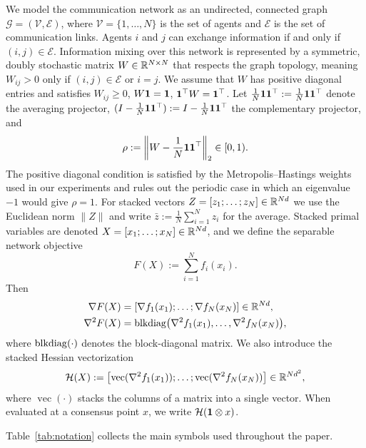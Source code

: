 \documentclass[review,onefignum,onetabnum]{siamart171218}
\begin{document}
	We model the communication network as an undirected, connected
	graph $\mathcal{G} = (\mathcal{V}, \mathcal{E})$, where
	$\mathcal{V} = \{1, \dots, N\}$ is the set of agents and
	$\mathcal{E}$ is the set of communication links.
	Agents $i$ and $j$ can exchange information if and only if
	$(i,j) \in \mathcal{E}$.
	Information mixing over this network is represented by a symmetric,
	doubly stochastic matrix $W \in \mathbb{R}^{N \times N}$ that respects
	the graph topology, meaning $W_{ij} > 0$ only if
	$(i,j) \in \mathcal{E}$ or $i=j$.
	We assume that $W$ has positive diagonal entries and satisfies
	$W_{ij}\ge0$, $W\mathbf{1}=\mathbf{1}$, $\mathbf{1}^\top W=\mathbf{1}^\top$.
	Let $\frac{1}{N}\mathbf{1}\mathbf{1}^\top:=\frac{1}{N}\mathbf{1}\mathbf{1}^\top$ denote the averaging projector,
	$(I-\frac{1}{N}\mathbf{1}\mathbf{1}^\top):=I-\frac{1}{N}\mathbf{1}\mathbf{1}^\top$ the complementary projector, and
	\[
	\rho := \left\|W-\frac{1}{N}\mathbf{1}\mathbf{1}^\top\right\|_2\in[0,1).
	\]
	The positive diagonal condition is satisfied by the
	Metropolis--Hastings weights used in our experiments and rules out
	the periodic case in which an eigenvalue~$-1$ would give $\rho=1$.
	For stacked vectors $Z=[z_1;\dots;z_N]\in\mathbb{R}^{Nd}$ we use the
	Euclidean norm $\|Z\|$ and write $\bar z:=\frac1N\sum_{i=1}^N z_i$
	for the average.
	Stacked primal variables are denoted
	$X=[x_1;\dots;x_N]\in\mathbb{R}^{Nd}$, and we define the separable
	network objective
	\[
	F(X):=\sum_{i=1}^N f_i(x_i).
	\]
	Then
	\begin{align*}
		\nabla F(X)&=[\nabla f_1(x_1);\dots;\nabla f_N(x_N)]\in\mathbb{R}^{Nd},\\
		\nabla^2 F(X)&=\operatorname{blkdiag}\bigl(\nabla^2 f_1(x_1),\dots,\nabla^2 f_N(x_N)\bigr),
	\end{align*}
	where $\operatorname{blkdiag}(\cdot)$ denotes the block-diagonal matrix.
	We also introduce the stacked Hessian vectorization
	\[
	\mathcal H(X):=\bigl[\operatorname{vec}(\nabla^2 f_1(x_1));\dots;\operatorname{vec}(\nabla^2 f_N(x_N))\bigr]\in\mathbb{R}^{Nd^2},
	\]
	where $\operatorname{vec}(\cdot)$ stacks the columns of a matrix into a single vector.
	When evaluated at a consensus point $x$, we write $\mathcal H(\mathbf{1}\otimes x)$.
	
	Table~\ref{tab:notation} collects the main symbols used
	throughout the paper.
	
\end{document}
